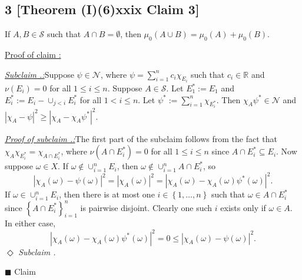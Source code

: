 \documentclass[12pt]{article}
\newcounter{ProofCounter}
\newcounter{ClaimCounter}[ProofCounter]
\newcounter{SubClaimCounter}[ClaimCounter]
\newenvironment{claimproof}[1]{\par\noindent\underline{Proof of claim \theClaimCounter:}\space#1}{\hfill $\blacksquare$ Claim \theClaimCounter}
\newenvironment{subclaim}[1]{\stepcounter{SubClaimCounter}\par\noindent\emph{\underline{Subclaim \theClaimCounter.\theSubClaimCounter:}}\space#1}{}
\newenvironment{subclaimproof}[1]{\par\noindent\emph{\underline{Proof of subclaim \theClaimCounter.\theSubClaimCounter:}}\space#1}{\hfill
$\Diamond$ \emph{Subclaim \theClaimCounter.\theSubClaimCounter}}
\begin{document}
\subsection*{3 [Theorem (I)(6)xxix Claim 3]}
\begin{tcolorbox}
If $A,B \in \mathcal{S}$ such that $A\cap B = \emptyset$, then $\mu_0(A\cup B) = \mu_0(A) + \mu_0(B)$.
\end{tcolorbox}
\begin{claimproof}
\begin{subclaim}
Suppose $\psi \in \mathcal{N}$, where $\psi = \sum_{i=1}^{n}c_{i}\chi_{E_{i}}$ such that $c_{i} \in \mathbb{R}$ and $\nu(E_{i}) = 0$ for all $1 \leq
i \leq n$. Suppose $A\in \mathcal{S}$. Let $E_{1}^{*} := E_{1}$ and $E_{i}^{*} := E_{i} - \cup_{j < i}E_{i}^{*}$ for all $1 < i \leq
n$. Let $\psi^{*} := \sum_{i=1}^{n}\chi_{E_{i}^{*}}$.
Then $\chi_{A}\psi^{*} \in \mathcal{N}$ and $|\chi_{A} - \psi|^{2} \geq |\chi_{A} - \chi_{A}\psi^*|^2$.
\end{subclaim}
\begin{subclaimproof}
The first part of the subclaim follows from the fact that $\chi_{A}\chi_{E_{i}^*} = \chi_{A\cap E_{i}^{*}}$, where $\nu(A\cap E_{i}^{*}) = 0$ 
for all $1 \leq i \leq n$ since $A\cap E_{i}^* \subseteq E_{i}$. Now suppose
$\omega \in X$. If $\omega \notin \cup_{i=1}^{n}E_{i}$, then $\omega \notin \cup_{i=1}^{n}A\cap E_{i}^{*}$, so
\[ |\chi_{A}(\omega) - \psi(\omega)|^{2} = |\chi_{A}(\omega)|^{2} = |\chi_{A}(\omega) - \chi_{A}(\omega)\psi^{*}(\omega)|^{2}. \]
If $\omega \in \cup_{i=1}^{n}E_{i}$, then there is at most one $i \in \left\{ 1, \hdots, n \right\}$ such that $\omega \in A\cap E_{i}^{*}$ since 
$\left\{ A\cap E_{i}^{*} \right\}_{i=1}^{n}$ is pairwise disjoint. Clearly one such $i$ exists only if $\omega \in A$. In either case,
\[ |\chi_{A}(\omega) - \chi_{A}(\omega)\psi^*(\omega)|^{2} = 0 \leq |\chi_{A}(\omega) - \psi(\omega)|^{2}. \]
\end{subclaimproof}


\end{claimproof}
\end{document}
